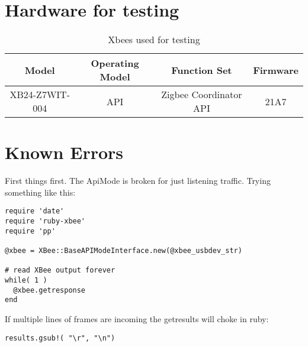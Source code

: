 

\section{Hardware for testing}
\begin{table}[ht]
\caption{Xbees used for testing}
\centering
\begin{tabular}{c c c c}
\hline\hline
Model & Operating Model & Function Set & Firmware \\ [0.5ex] %
\hline
XB24-Z7WIT-004 & API & Zigbee Coordinator API & 21A7 \\ [1ex]
\hline
\end{tabular}
\label{table:nonlin}
\end{table}

\section{Known Errors}
First things first. The ApiMode is broken for just listening traffic. Trying something like this:
\begin{code}
\begin{lstlisting}
require 'date'
require 'ruby-xbee'
require 'pp'

@xbee = XBee::BaseAPIModeInterface.new(@xbee_usbdev_str)

# read XBee output forever
while( 1 )
  @xbee.getresponse
end
\end{lstlisting}
\end{code}

If multiple lines of frames are incoming the getresults will choke in ruby:
\begin{code}
\begin{lstlisting}
results.gsub!( "\r", "\n")
\end{lstlisting}
\end{code}